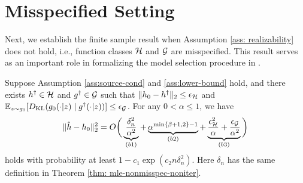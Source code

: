 \vspace{-2mm}
\section{Misspecified Setting}\label{sec:misspecified}
\vspace{-2mm}

Next, we establish the finite sample result when Assumption \ref{ass: realizability} does not hold, i.e., function classes $\mathcal{H}$ and $\mathcal{G}$ are misspecified. This result serves as an important role in formalizing the model selection procedure in . 

\vspace{-2mm}
\begin{theorem}\label{thm: mle-misspec}
    Suppose Assumption \ref{ass:source-cond} and \ref{ass:lower-bound} hold, and there exists $h^{\dag}\in \mathcal{H}$ and $g^{\dag} \in \mathcal{G}$ such that $\|h_0 - h^{\dag}\|_2 \leq \epsilon_{\mathcal{H}}$ and $\mathbb{E}_{z\sim g_0}[D_{\text{KL}}(g_0(\cdot|z)\mid g^{\dag}(\cdot|z))] \leq \epsilon_{\mathcal{G}}$. 
    For any $0<\alpha\leq 1$, we have \begin{align*}
\|\hat{h} - h_0\|_2^2= O\bigg(\underbrace{\frac{\delta_n^2}{\alpha^2}}_{(b1)}+ \underbrace{\alpha^{\min\{\beta+1,2\}-1}}_{ (b2)}+\underbrace{\frac{\epsilon_{\mathcal{H}}^2}{\alpha} + \frac{  \epsilon_{\mathcal{G}}}{\alpha^2}}_{(b3)}\bigg)
\end{align*}
holds with probability at least $1- c_1\exp(c_2n\delta_n^2)$. Here $\delta_{n}$ has the same definition in Theorem \ref{thm: mle-nonmisspec-noniter}.
\end{theorem}


